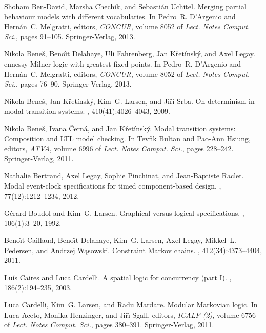 \documentclass[twocolumn]{svjour3-dummy}
\begin{document}
\begin{thebibliography}{10}
Shoham Ben-David, Marsha Chechik, and Sebasti{\'a}n Uchitel.
\newblock Merging partial behaviour models with different vocabularies.
\newblock In Pedro~R. D'Argenio and Hern{\'a}n~C. Melgratti, editors, {\em
  CONCUR}, volume 8052 of {\em {Lect. Notes Comput. Sci.}}, pages 91--105.
  {Springer-Verlag}, 2013.

Nikola Bene\v{s}, Beno\^{\i}t Delahaye, Uli Fahrenberg, Jan K{\v
  r}et{\'i}nsk{\'y}, and Axel Legay.
ennessy-{M}ilner logic with greatest fixed points.
\newblock In Pedro~R. D'Argenio and Hern{\'a}n~C. Melgratti, editors, {\em
  CONCUR}, volume 8052 of {\em {Lect. Notes Comput. Sci.}}, pages 76--90.
  {Springer-Verlag}, 2013.

Nikola Bene\v{s}, Jan K{\v r}et{\'i}nsk{\'y}, Kim~G. Larsen, and Ji{\v r}{\'i}
  Srba.
\newblock On determinism in modal transition systems.
, 410(41):4026--4043, 2009.

Nikola Bene\v{s}, Ivana \v{C}ern{\'a}, and Jan K{\v r}et{\'i}nsk{\'y}.
\newblock Modal transition systems: Composition and {LTL} model checking.
\newblock In Tevfik Bultan and Pao-Ann Hsiung, editors, {\em ATVA}, volume 6996
  of {\em {Lect. Notes Comput. Sci.}}, pages 228--242. {Springer-Verlag}, 2011.

Nathalie Bertrand, Axel Legay, Sophie Pinchinat, and Jean-Baptiste Raclet.
\newblock Modal event-clock specifications for timed component-based design.
, 77(12):1212--1234, 2012.

G{\'e}rard Boudol and Kim~G. Larsen.
\newblock Graphical versus logical specifications.
, 106(1):3--20, 1992.

Beno{\^{\i}}t Caillaud, Beno{\^{\i}}t Delahaye, Kim~G. Larsen, Axel Legay,
  Mikkel~L. Pedersen, and Andrzej W{\k a}sowski.
\newblock Constraint {M}arkov chains.
, 412(34):4373--4404, 2011.

Lu{\'i}s Caires and Luca Cardelli.
\newblock A spatial logic for concurrency (part {I}).
, 186(2):194--235, 2003.

Luca Cardelli, Kim~G. Larsen, and Radu Mardare.
\newblock Modular {M}arkovian logic.
\newblock In Luca Aceto, Monika Henzinger, and Ji{\v r}{\'\i} Sgall, editors,
  {\em ICALP (2)}, volume 6756 of {\em {Lect. Notes Comput. Sci.}}, pages
  380--391. {Springer-Verlag}, 2011.


\end{thebibliography}
\end{document}
